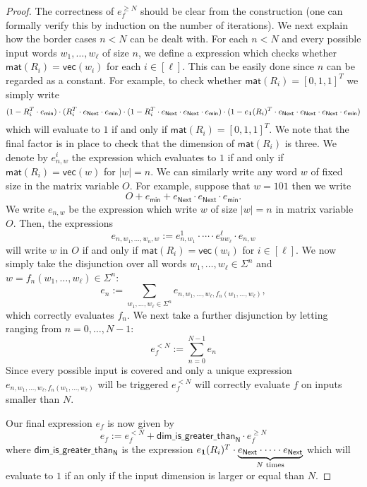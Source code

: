 \begin{proof}
The correctness of $e_f^{\geq N}$ should be clear from the construction (one can formally verify this by
induction on the number of iterations). We next explain how the border cases $n<N$ can be dealt with.
For each $n<N$ and every possible input words
$w_1,\ldots,w_\ell$ of size $n$, we define a \langfor expression which checks whether
$\mathsf{mat}(R_i)=\mathsf{vec}(w_i)$ for each $i\in[\ell]$. This can be easily done since $n$ 
can be regarded as a constant. For example, to check whether $\mathsf{mat}(R_i)=[0,1,1]^T$ we simply write
$$
(1- R_i^T\cdot e_{\mathsf{min}})\cdot (R_i^T\cdot e_{\mathsf{Next}}\cdot e_{\mathsf{min}})\cdot (1- R_i^T\cdot e_{\mathsf{Next}}\cdot e_{\mathsf{Next}}\cdot e_{\mathsf{min}})\cdot (1- e_{\mathbf{1}}(R_i)^T\cdot e_{\mathsf{Next}}\cdot e_{\mathsf{Next}}\cdot e_{\mathsf{Next}}\cdot e_{\mathsf{min}})
$$
which will evaluate to $1$ if and only if $\mathsf{mat}(R_i)=[0,1,1]^T$. We note that the final factor is in 
place to check that the dimension of $\mathsf{mat}(R_i)$ is three.
  We denote by
$e_{n,w}^i$ the expression which evaluates to $1$ if and only if $\mathsf{mat}(R_i)=\mathsf{vec}(w)$
for $|w|=n$.
We can similarly
write any word $w$ of fixed size in the matrix variable $O$. For example, suppose that $w=101$
then we write 
$$
O+ e_{\mathsf{min}}+  e_{\mathsf{Next}}\cdot e_{\mathsf{Next}}\cdot e_{\mathsf{min}}.
$$
We write $e_{n,w}$ be the expression which write $w$ of size $|w|=n$ in matrix variable $O$.
Then, the expressions
$$
e_{n,w_1,\ldots,w_n,w}:=e_{n,w_1}^1\cdot\cdots\cdot e_{nw_{\ell}}^\ell\cdot e_{n,w}
$$
will write $w$ in $O$ if and only if $\mathsf{mat}(R_i)=\mathsf{vec}(w_i)$ for $i\in[\ell]$.
We now simply take the disjunction over all words 
$w_1,\ldots,w_\ell\in\Sigma^n$ and $w=f_n(w_1,\ldots,w_\ell)\in\Sigma^n$:
$$
e_n:=\sum_{w_1,\ldots,w_\ell\in\Sigma^n} e_{n,w_1,\ldots,w_\ell,f_n(w_1,\ldots,w_\ell)},
$$
which correctly evaluates $f_n$. We next take a further disjunction by letting ranging from 
$n=0,\ldots, N-1$:
$$
e_f^{<N}:=\sum_{n=0}^{N-1} e_n
$$
Since every possible input is covered and only a unique expression 
$ e_{n,w_1,\ldots,w_\ell,f_n(w_1,\ldots,w_\ell)}$ will be triggered $e_f^{<N}$ will correctly
evaluate $f$ on inputs smaller than $N$.

Our final expression $e_f$ is now given by
$$
e_f:=e_f^{<N} + \mathsf{dim\_is\_greater\_than_N}\cdot e_f^{\geq N}
$$
where $\mathsf{dim\_is\_greater\_than_N}$ is the expression
$e_{\mathbf{1}}(R_i)^T\cdot\underbrace{e_{\mathsf{Next}}\cdot\cdots\cdot e_{\mathsf{Next}}}_{\text{$N$ times}}$ 
which will evaluate to $1$ if an only if the input dimension is larger or equal than $N$.
\end{proof}
